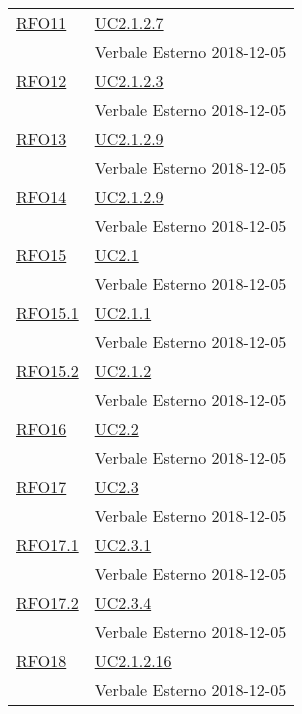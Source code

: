 \begin{longtable}{|>{\centering}m{5cm}|m{5cm}<{\centering}|}
	\hyperlink{RFO11}{RFO11} & \hyperref[UC2.1.2.7]{UC2.1.2.7} \\& Verbale Esterno 2018-12-05\\ \hline
	
	\hyperlink{RFO12}{RFO12} & \hyperref[UC2.1.2.3]{UC2.1.2.3} \\& Verbale Esterno 2018-12-05\\ \hline
	
	\hyperlink{RFO13}{RFO13} & \hyperref[UC2.1.2.9]{UC2.1.2.9} \\& Verbale Esterno 2018-12-05\\ \hline
	
	\hyperlink{RFO14}{RFO14} & \hyperref[UC2.1.2.9]{UC2.1.2.9} \\& Verbale Esterno 2018-12-05\\ \hline
	
	\hyperlink{RFO15}{RFO15} & \hyperref[UC2.1]{UC2.1} \\& Verbale Esterno 2018-12-05\\ \hline
	\pagebreak
	\hyperlink{RFO15.1}{RFO15.1} & \hyperref[UC2.1.1]{UC2.1.1} \\& Verbale Esterno 2018-12-05\\ \hline
	
	\hyperlink{RFO15.2}{RFO15.2} & \hyperref[UC2.1.2]{UC2.1.2} \\& Verbale Esterno 2018-12-05\\ \hline
	
	\hyperlink{RFO16}{RFO16} & \hyperref[UC2.2]{UC2.2} \\& Verbale Esterno 2018-12-05\\ \hline
	
	\hyperlink{RFO17}{RFO17} & \hyperref[UC2.3]{UC2.3} \\& Verbale Esterno 2018-12-05\\ \hline
	
	\hyperlink{RFO17.1}{RFO17.1} & \hyperref[UC2.3.1]{UC2.3.1} \\& Verbale Esterno 2018-12-05\\ \hline
	
	\hyperlink{RFO17.2}{RFO17.2} & \hyperref[UC2.3.4]{UC2.3.4} \\& Verbale Esterno 2018-12-05\\ \hline
	
	\hyperlink{RFO18}{RFO18} & \hyperref[UC2.1.2.16]{UC2.1.2.16} \\& Verbale Esterno 2018-12-05\\ \hline
	

\end{longtable}
